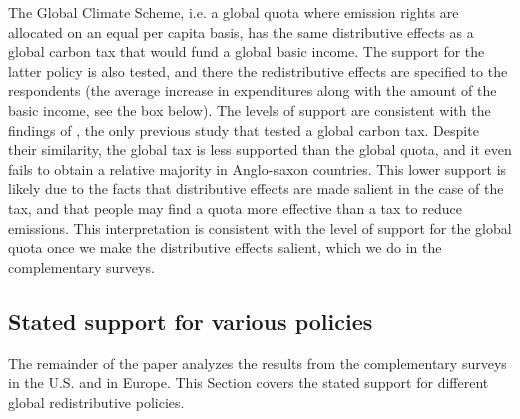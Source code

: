 The Global Climate Scheme, i.e. a global quota where emission rights are allocated on an equal per capita basis, has the same distributive effects as a global carbon tax that would fund a global basic income. The support for the latter policy is also tested, and there the redistributive effects are specified to the respondents (the average increase in expenditures along with the amount of the basic income, see the box below). %
The levels of support are consistent with the findings of \citet{carattini_how_2019}, the only previous study that tested a global carbon tax. Despite their similarity, the global tax is less supported than the global quota, and it even fails to obtain a relative majority in Anglo-saxon countries. This lower support is likely due to the facts that distributive effects are made salient in the case of the tax, and that people may find a quota more effective than a tax to reduce emissions. This interpretation is consistent with the level of support for the global quota once we make the distributive effects salient, which we do in the complementary surveys. %


\subsection{Stated support for various policies}
The remainder of the paper analyzes the results from the complementary surveys in the U.S. and in Europe. This Section covers the stated support for different global redistributive policies. %


